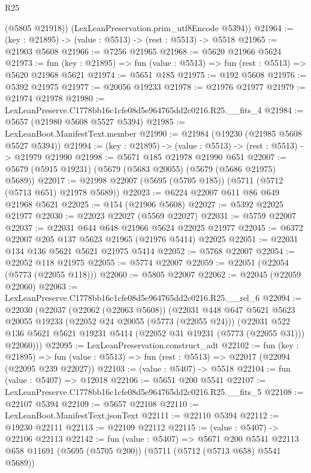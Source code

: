 \begin{lexlean}{R25}
\begin{coremodule}
        (@5805 @21918))
      (LexLeanPreservation.prim_utf8Encode @5394))
@21964 := (key : @21895) -> (value : @5513) -> (rest : @5513) -> @5518
@21965 := @21903 @5608
@21966 := @7256 @21965
@21968 := @5620 @21966 @5624
@21973 := fun (key : @21895) => fun (value : @5513) => fun (rest : @5513) => @5620 @21968 @5621
@21974 := @5651 @185
@21975 := @192 @5608
@21976 := @5392 @21975
@21977 := @20056 @19233
@21978 := @21976 @21977
@21979 := @21974 @21978
@21980 := LexLeanPreserve.C1778bb16c1cfe08d5e964765dd2c0216.R25.__fits_4
@21984 := @5657 (@21980 @5608 @5527 @5394)
@21985 := LexLeanBoot.ManifestText.member
@21990 := @21984 (@19230 (@21985 @5608 @5527 @5394))
@21994 := (key : @21895) -> (value : @5513) -> (rest : @5513) -> @21979 @21990
@21998 := @5671 @185 @21978 @21990 @651
@22007 := @5679 (@5915 @19231) (@5679 (@5683 @20055) (@5679 (@5686 @21975) @5689))
@22017 := @21998 @22007 (@5695 (@5705 @185)) (@5711 (@5712 (@5713 @651) @21978 @5689))
@22023 := @6224 @22007 @611 @86 @649 @21968 @5621
@22025 := @154 (@21906 @5608)
@22027 := @5392 @22025 @21977
@22030 := @22023 @22027 (@5569 @22027)
@22031 := @5759 @22007
@22037 := @22031 @644 @648 @21966 @5624 @22025 @21977
@22045 := @6372 @22007 @205 @137 @5623 @21965 (@21976 @5414) @22025
@22051 := @22031 @134 @136 @5621 @5621 @21975 @5414
@22052 := @5768 @22007
@22054 := @22052 @118 @21975
@22055 := @5774 @22007
@22059 := @22051 (@22054 (@5773 (@22055 @118)))
@22060 := @5805 @22007
@22062 := @22045 (@22059 @22060)
@22063 := LexLeanPreserve.C1778bb16c1cfe08d5e964765dd2c0216.R25.__rel_6
@22094 := @22030
    (@22037
      (@22062 (@22063 @5608))
      (@22031
        @448
        @647
        @5621
        @5623
        @20055
        @19233
        (@22052 @24 @20055 (@5773 (@22055 @24)))
        (@22031
          @522
          @136
          @5621
          @5621
          @19231
          @5414
          (@22052 @31 @19231 (@5773 (@22055 @31)))
          @22060)))
@22095 := LexLeanPreservation.construct_adt
@22102 := fun (key : @21895) =>
  fun (value : @5513) => fun (rest : @5513) => @22017 (@22094 (@22095 @239 @22027))
@22103 := (value : @5407) -> @5518
@22104 := fun (value : @5407) => @12018
@22106 := @5651 @200 @5541
@22107 := LexLeanPreserve.C1778bb16c1cfe08d5e964765dd2c0216.R25.__fits_5
@22108 := @22107 @5394
@22109 := @5657 @22108
@22110 := LexLeanBoot.ManifestText.jsonText
@22111 := @22110 @5394
@22112 := @19230 @22111
@22113 := @22109 @22112
@22115 := (value : @5407) -> @22106 @22113
@22142 := fun (value : @5407) =>
  @5671
    @200
    @5541
    @22113
    @658
    @11691
    (@5695 (@5705 @200))
    (@5711 (@5712 (@5713 @658) @5541 @5689))

\end{coremodule}
\end{lexlean}
